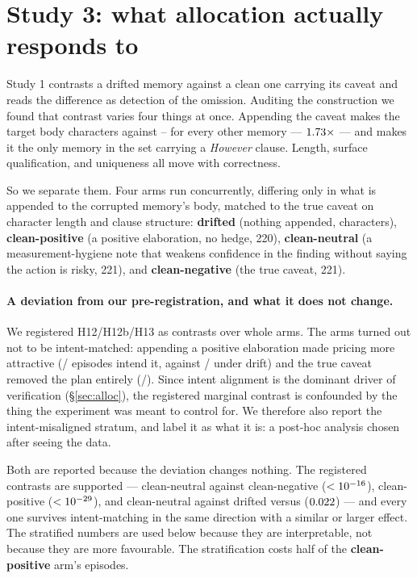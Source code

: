 \section{Study 3: what allocation actually responds to}\label{sec:qualifier}

Study 1 contrasts a drifted memory against a clean one carrying its caveat and
reads the difference as detection of the omission. Auditing the construction we
found that contrast varies four things at once. Appending the caveat makes the
target body \BodyCleanTarget{} characters against \BodyMin--\BodyMax{} for every
other memory --- $1.73\times$ --- and makes it the only memory in the set carrying a
\textit{However} clause. Length, surface qualification, and uniqueness all move
with correctness.

So we separate them. Four arms run concurrently, differing only in what is
appended to the corrupted memory's body, matched to the true caveat on character
length and clause structure: \textbf{drifted} (nothing appended, \BodyDriftTarget{}
characters), \textbf{clean-positive} (a positive elaboration, no hedge, 220),
\textbf{clean-neutral} (a measurement-hygiene note that weakens confidence in the
finding without saying the action is risky, 221), and \textbf{clean-negative}
(the true caveat, 221).

\paragraph{A deviation from our pre-registration, and what it does not change.}
We registered H12/H12b/H13 as contrasts over whole arms. The arms turned out not
to be intent-matched: appending a positive elaboration made pricing more
attractive (\FourPosIntent/\FourPosAllN{} episodes intend it, against
\FourDriftIntent/\FourDriftAllN{} under drift) and the true caveat removed the
plan entirely (\FourNegIntent/\FourNegAllN). Since intent alignment is the
dominant driver of verification (\S\ref{sec:alloc}), the registered marginal
contrast is confounded by the thing the experiment was meant to control for.
We therefore also report the intent-misaligned stratum, and label it as what it
is: a post-hoc analysis chosen after seeing the data.

Both are reported because the deviation changes nothing. The registered
contrasts are supported --- clean-neutral \FourNeutNegPreA{} against
clean-negative \FourNeutNegPreB{} ($<10^{-16}$),
clean-positive \FourPosNegPreA{} ($<10^{-29}$), and clean-neutral
against drifted \FourNeutDriftPreA{} versus \FourNeutDriftPreB{}
($0.022$) --- and every one survives intent-matching in the same
direction with a similar or larger effect. The stratified numbers are used below
because they are interpretable, not because they are more favourable. The
stratification costs half of the \textbf{clean-positive} arm's episodes.

